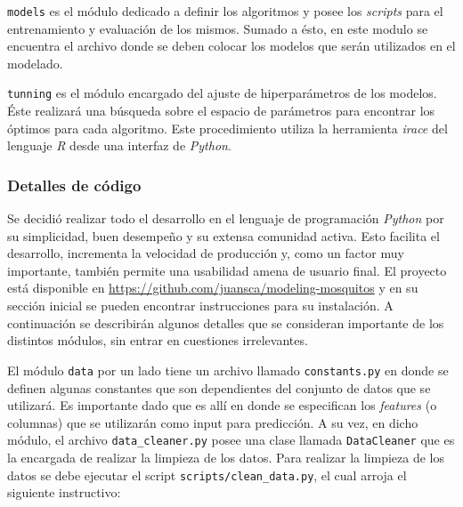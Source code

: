         \par \verb|models| es el módulo dedicado a definir los algoritmos y
          posee los \textit{scripts} para el entrenamiento y
          evaluación de los mismos. Sumado a ésto, en este modulo se encuentra
          el archivo donde se deben colocar los modelos que serán utilizados
          en el modelado.

        \par \verb|tunning| es el módulo encargado del ajuste de hiperparámetros
          de los modelos. Éste realizará una búsqueda sobre el espacio de
          parámetros para encontrar los óptimos para cada algoritmo. Este
          procedimiento utiliza la herramienta \textit{irace} del lenguaje
          \textit{R} desde una interfaz de \textit{Python}.

      \subsubsection{Detalles de código}

        \par Se decidió realizar todo el desarrollo en el lenguaje de programación
          \textit{Python} por su simplicidad, buen desempeño y su extensa
          comunidad activa. Esto facilita el desarrollo, incrementa la velocidad
          de producción y, como un factor muy importante, también permite
          una usabilidad amena de usuario final. El proyecto está disponible
          en \url{https://github.com/juansca/modeling-mosquitos} y en su sección
          inicial se pueden encontrar instrucciones para su instalación.
          A continuación se describirán
          algunos detalles que se consideran importante de los distintos módulos,
          sin entrar en cuestiones irrelevantes.

        \par El módulo \verb|data| por un lado tiene un archivo llamado
          \verb|constants.py| en donde se definen algunas constantes que
          son dependientes del conjunto de datos que se utilizará. Es importante
          dado que es allí en donde se especifican los \textit{features} (o
          columnas) que se utilizarán como input para predicción.
          A su vez, en dicho módulo, el archivo \verb|data_cleaner.py|
          posee una clase llamada \verb|DataCleaner| que es la encargada de
          realizar la limpieza de los datos. Para realizar la limpieza de los
          datos se debe ejecutar el script \verb|scripts/clean_data.py|, el
          cual arroja el siguiente instructivo:

